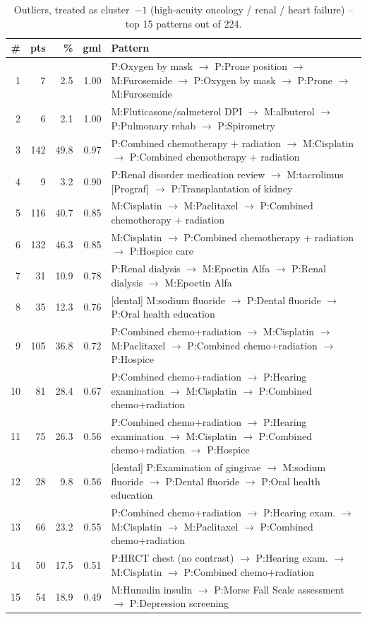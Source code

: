 \begin{table}[H]
\centering
\footnotesize
\setlength{\arraystretch}{1.05}
\begin{tabular}{@{}r r r r p{9.5cm}@{}}
\toprule
\# & pts & \% & gml & Pattern \\
\midrule
1  &    7 &  2.5 & 1.00 & P:Oxygen by mask $\to$ P:Prone position $\to$ M:Furosemide $\to$ P:Oxygen by mask $\to$ P:Prone $\to$ M:Furosemide \\
2  &    6 &  2.1 & 1.00 & M:Fluticasone/salmeterol DPI $\to$ M:albuterol $\to$ P:Pulmonary rehab $\to$ P:Spirometry \\
3  &  142 & 49.8 & 0.97 & P:Combined chemotherapy + radiation $\to$ M:Cisplatin $\to$ P:Combined chemotherapy + radiation \\
4  &    9 &  3.2 & 0.90 & P:Renal disorder medication review $\to$ M:tacrolimus [Prograf] $\to$ P:Transplantation of kidney \\
5  &  116 & 40.7 & 0.85 & M:Cisplatin $\to$ M:Paclitaxel $\to$ P:Combined chemotherapy + radiation \\
6  &  132 & 46.3 & 0.85 & M:Cisplatin $\to$ P:Combined chemotherapy + radiation $\to$ P:Hospice care \\
7  &   31 & 10.9 & 0.78 & P:Renal dialysis $\to$ M:Epoetin Alfa $\to$ P:Renal dialysis $\to$ M:Epoetin Alfa \\
8  &   35 & 12.3 & 0.76 & [dental] M:sodium fluoride $\to$ P:Dental fluoride $\to$ P:Oral health education \\
9  &  105 & 36.8 & 0.72 & P:Combined chemo+radiation $\to$ M:Cisplatin $\to$ M:Paclitaxel $\to$ P:Combined chemo+radiation $\to$ P:Hospice \\
10 &   81 & 28.4 & 0.67 & P:Combined chemo+radiation $\to$ P:Hearing examination $\to$ M:Cisplatin $\to$ P:Combined chemo+radiation \\
11 &   75 & 26.3 & 0.56 & P:Combined chemo+radiation $\to$ P:Hearing examination $\to$ M:Cisplatin $\to$ P:Combined chemo+radiation $\to$ P:Hospice \\
12 &   28 &  9.8 & 0.56 & [dental] P:Examination of gingivae $\to$ M:sodium fluoride $\to$ P:Dental fluoride $\to$ P:Oral health education \\
13 &   66 & 23.2 & 0.55 & P:Combined chemo+radiation $\to$ P:Hearing exam. $\to$ M:Cisplatin $\to$ M:Paclitaxel $\to$ P:Combined chemo+radiation \\
14 &   50 & 17.5 & 0.51 & P:HRCT chest (no contrast) $\to$ P:Hearing exam. $\to$ M:Cisplatin $\to$ P:Combined chemo+radiation \\
15 &   54 & 18.9 & 0.49 & M:Humulin insulin $\to$ P:Morse Fall Scale assessment $\to$ P:Depression screening \\
\bottomrule
\end{tabular}
\caption{Outliers, treated as cluster~$-1$ (high-acuity oncology / renal / heart failure) -- top 15 patterns out of 224.}
\label{tab:ch6_seq_outliers}
\end{table}

